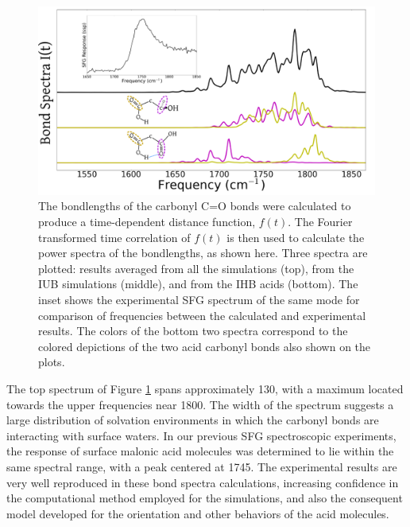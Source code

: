 \begin{figure}[h!]
	\begin{center}
		\includegraphics[scale=1.0]{images/bond-spectra/BondSpectra.png}
		\caption{The bondlengths of the carbonyl C=O bonds were calculated to produce a time-dependent distance function, $f(t)$. The Fourier transformed time correlation of $f(t)$ is then used to calculate the power spectra of the bondlengths, as shown here. Three spectra are plotted: results averaged from all the simulations (top), from the IUB simulations (middle), and from the IHB acids (bottom). The inset shows the experimental SFG spectrum of the same mode for comparison of frequencies between the calculated and experimental results. The colors of the bottom two spectra correspond to the colored depictions of the two acid carbonyl bonds also shown on the plots.}
		\label{fig:bond-spectra}
	\end{center}
\end{figure}

The top spectrum of Figure \ref{fig:bond-spectra} spans approximately 130\cm, with a maximum located towards the upper frequencies near 1800\cm. The width of the spectrum suggests a large distribution of solvation environments in which the carbonyl bonds are interacting with surface waters. In our previous SFG spectroscopic experiments, the response of surface malonic acid molecules was determined to lie within the same spectral range, with a peak centered at 1745\cm. The experimental results are very well reproduced in these bond spectra calculations, increasing confidence in the computational method employed for the simulations, and also the consequent model developed for the orientation and other behaviors of the acid molecules.

